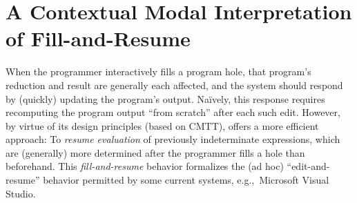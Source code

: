 


\newcommand{\commutativitySec}{A Contextual Modal Interpretation of Fill-and-Resume}
\section{\protect\commutativitySec}
\label{sec:resumption}



When the programmer interactively fills a program hole, that program's
reduction and result are generally each affected, and the system
should respond by (quickly) updating the program's output.
%
Na\"ively, this response requires recomputing the program output
``from scratch'' after each such edit.
%
However, by virtue of its design principles (based on
CMTT), \HazelnutLive offers a more efficient approach: To \emph{resume
evaluation} of previously indeterminate expressions, which are
(generally) more determined after the programmer fills a hole than
beforehand.
%
This \emph{fill-and-resume} behavior formalizes the (ad hoc)
``edit-and-resume'' behavior permitted by some current systems,
e.g.,~Microsoft Visual Studio.

